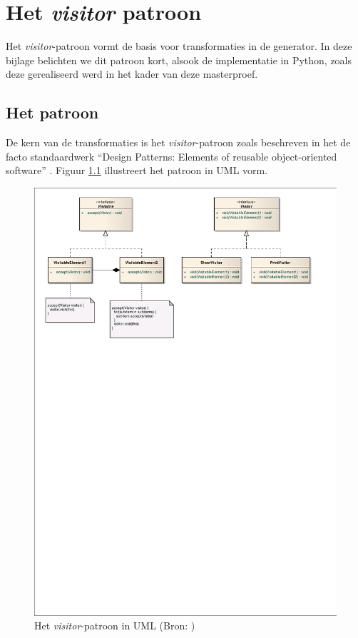 
\chapter{Het \emph{visitor} patroon}
\label{appendix:visitor}

Het \emph{visitor}-patroon vormt de basis voor transformaties in de generator.
In deze bijlage belichten we dit patroon kort, alsook de implementatie in
Python, zoals deze gerealiseerd werd in het kader van deze masterproef.

\section{Het patroon}
\label{section:devel-visitor-pattern}

\setlength{\parindent}{15pt} %

De kern van de transformaties is het \emph{visitor}-patroon zoals beschreven in
het de facto standaardwerk ``Design Patterns: Elements of reusable
object-oriented software'' \citep{gamma1994design}. Figuur \ref{fig:visitor}
illustreert het patroon in UML vorm.

\begin{figure}[ht]
  \centering
  \includegraphics[width=0.9\linewidth]{resources/visitor.pdf}
  \caption[Het \emph{visitor}-patroon in UML]{Het \emph{visitor}-patroon in UML (Bron: \citep{wikipedia:visitor})}
  \label{fig:visitor}
\end{figure}

